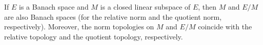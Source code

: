 If $E$ is a Banach space and $M$ is a closed linear subspace of $E$, then $M$ and $E/M$ are also Banach spaces (for the relative norm and the quotient norm, respectively). Moreover, the norm topologies on $M$ and $E/M$ coincide with the relative topology and the quotient topology, respectively.
